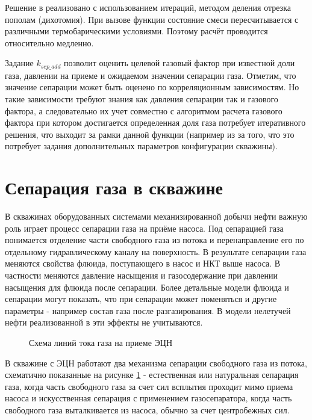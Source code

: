 Решение в \unf{} реализовано с использованием итераций, методом деления отрезка пополам (дихотомия). При вызове функции  состояние смеси пересчитывается с различными термобарическими условиями. Поэтому расчёт проводится относительно медленно. 

Задание $k_{sep\_add}$ позволит оценить целевой газовый фактор при известной доли газа, давлении на приеме и ожидаемом значении сепарации газа. Отметим, что значение сепарации может быть оценено по корреляционным зависимостям. Но такие зависимости требуют знания как давления сепарации так и газового фактора, а следовательно их учет совместно с алгоритмом расчета газового фактора при котором достигается определенная доля газа потребует итеративного решения, что выходит за рамки данной функции (например из за того, что это потребует задания дополнительных параметров конфигурации скважины).


\section{Сепарация газа в скважине}
В скважинах оборудованных системами механизированной добычи нефти важную роль играет процесс сепарации газа на приёме насоса. Под сепарацией газа понимается отделение части свободного газа из потока и перенаправление его по отдельному гидравлическому каналу на поверхность. В результате сепарации газа меняются свойства флюида, поступающего в насос и НКТ выше насоса. В частности меняются давление насыщения и газосодержание при давлении насыщения для флюида после сепарации. Более детальные модели флюида и сепарации могут показать, что при сепарации может поменяться и другие параметры - например состав газа после разгазирования. В модели нелетучей нефти реализованной в \unf{} эти эффекты не учитываются.


\begin{figure}[H]
	\centering
		
		\caption{Схема линий тока газа на приеме ЭЦН}
		\label{ris:separation_scheme}
\end{figure}

В скважине с ЭЦН работают два механизма сепарации свободного газа из потока, схематично показанные на рисунке \ref{ris:separation_scheme} - естественная или натуральная сепарация газа, когда часть свободного газа за счет сил всплытия проходит мимо приема насоса и искусственная сепарация с применением газосепаратора, когда часть свободного газа выталкивается из насоса, обычно за счет центробежных сил. 

